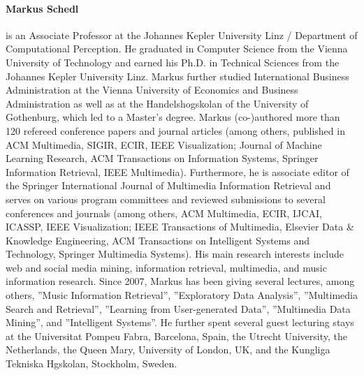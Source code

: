 {\paragraph{Markus Schedl} is an Associate Professor at the Johannes Kepler University Linz / Department of Computational Perception. He graduated in Computer Science from the Vienna University of Technology and earned his Ph.D. in Technical Sciences from the Johannes Kepler University Linz. Markus further studied International Business Administration at the Vienna University of Economics and Business Administration as well as at the Handelshogskolan of the University of Gothenburg, which led to a Master’s degree. Markus (co-)authored more than 120 refereed conference papers and journal articles (among others, published in ACM Multimedia, SIGIR, ECIR, IEEE Visualization; Journal of Machine Learning Research, ACM Transactions on Information Systems, Springer Information Retrieval, IEEE Multimedia). Furthermore, he is associate editor of the Springer International Journal of Multimedia Information Retrieval and serves on various program committees and reviewed submissions to several conferences and journals (among others, ACM Multimedia, ECIR, IJCAI, ICASSP, IEEE Visualization; IEEE Transactions of Multimedia, Elsevier Data \& Knowledge Engineering, ACM Transactions on Intelligent Systems and Technology, Springer Multimedia Systems). His main research interests include web and social media mining, information retrieval, multimedia, and music information research. Since 2007, Markus has been giving several lectures, among others, ”Music Information Retrieval”, ”Exploratory Data Analysis”, ”Multimedia Search and Retrieval”, ”Learning from User-generated Data”, ”Multimedia Data Mining”, and ”Intelligent Systems”. He further spent several guest lecturing stays at the Universitat Pompeu Fabra, Barcelona, Spain, the Utrecht University, the Netherlands, the Queen Mary, University of London, UK, and the Kungliga Tekniska Hgskolan, Stockholm, Sweden.

}
